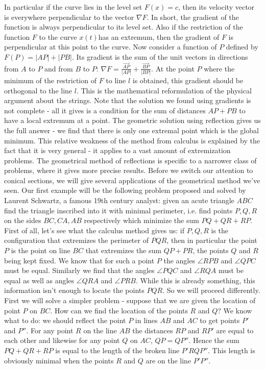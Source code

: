 In particular if the curve lies in the level set $F(x)=c$, then its velocity vector is everywhere perpendicular to the vector $\nabla F$. In short, the gradient of the function is always perpendicular to its level set.
Also if the restriction of the function $F$ to the curve $x(t)$has an extremum, then the gradient of $F$ is perpendicular at this point to the curve.
Now consider a function of $P$ defined by $F(P)=|AP|+|PB|$. Its gradient is the sum of the unit vectors in directions from $A$ to $P$ and from $B$ to $P$: $\nabla F=\frac{\vec{AP}}{|AP|}+\frac{\vec{BP}}{|BP|}$.
At the point $P$ where the minimum of the restriction of $F$ to line $l$ is obtained, this gradient should be orthogonal to the line $l$.
This is the mathematical reformulation of the physical argument about the strings.
Note that the solution we found using gradients is not complete - all it gives is a condition for the sum of distances $AP+PB$ to have a local extremum at a point. The geometric solution using reflection gives us the full answer - we find that there is only one extremal point which is the global minimum. This relative weakness of the method from calculus is explained by the fact that it is very general - it applies to a vast amount of extremization problems. The geometrical method of reflections is specific to a narrower class of problems, where it gives more precise results.
Before we switch our attention to conical sections, we will give several applications of the geometrical method we've seen.
Our first example will be the following problem proposed and solved by Laurent Schwartz, a famous 19th century analyst: given an acute triangle $ABC$ find the triangle inscribed into it with minimal perimeter, i.e. find points $P,Q,R$ on the sides $BC,CA,AB$ respectively which minimize the sum $PQ+QR+RP$.
First of all, let's see what the calculus method gives us: if $P,Q,R$ is the configuration that extremizes the perimeter of $PQR$, then in particular the point $P$ is the point on line $BC$ that extremizes the sum $QP+PR$, the points $Q$ and $R$ being kept fixed. We know that for such a point $P$ the angles $\angle RPB$ and $\angle QPC$ must be equal. Similarly we find that the angles $\angle PQC$ and $\angle RQA$ must be equal as well as angles $\angle QRA$ and $\angle PRB$.
While this is already something, this information isn't enough to locate the points $PQR$.
So we will proceed differently. First we will solve a simpler problem - suppose that we are given the location of point $P$ on $BC$. How can we find the location of the points $R$ and $Q$? We know what to do: we should reflect the point $P$ in lines $AB$ and $AC$ to get points $P'$ and $P''$. For any point $R$ on the line $AB$ the distances $RP$ and $RP'$ are equal to each other and likewise for any point $Q$ on $AC$, $QP=QP''$. Hence the sum $PQ+QR+RP$ is equal to the length of the broken line $P'RQP''$. This length is obviously minimal when the points $R$ and $Q$ are on the line $P'P''$.
